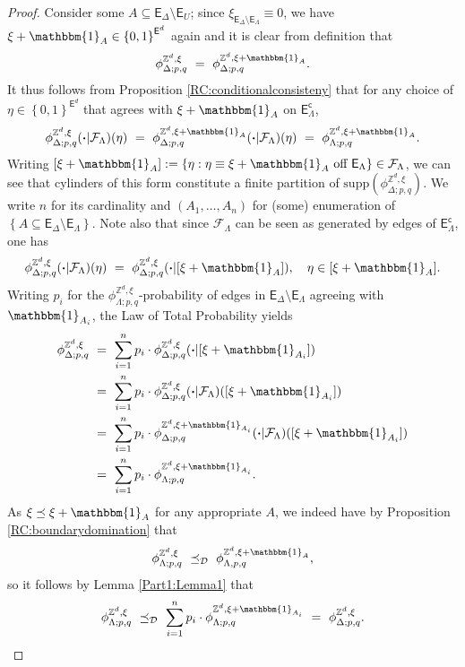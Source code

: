 \documentclass[12pt]{article}
\newcommand{\D}{\mathcal{D}}
\newcommand{\E}{\mathsf{E}}
\newcommand{\F}{\mathcal{F}}
\newcommand{\Z}{\mathbb{Z}}
\newcommand{\set}[1]{\left\{#1\right\}}
\newcommand{\pika}{\boldsymbol{\cdot}}
\newcommand{\1}{\mathbbm{1}}
\renewcommand{\c}{\mathsf{c}}
\newcommand{\supp}{\mathrm{supp}}
\newcommand{\5}{\vspace{0.5cm}}
\theoremstyle{definition}
\begin{document}
\begin{proof}
Consider some $A\subseteq\E_\Delta\setminus\E_U$; since $\xi_{\E_\Delta\setminus\E_\Lambda}\equiv 0$, we have $\xi+\1_A\in\set{0,1}^{\E^d}$ again and it is clear from definition that
$$\phi_{\Delta;p,q}^{\Z^d,\xi} ~=~ \phi_{\Delta;p,q}^{\Z^d,\xi+\1_A}.$$
It thus follows from Proposition \ref{RC:conditionalconsisteny} that for any choice of $\eta\in\set{0,1}^{\E^d}$ that agrees with $\xi+\1_A$ on $\E_\Lambda^\c$,
$$\phi_{\Delta;p,q}^{\Z^d,\xi}(\pika|\F_\Lambda)(\eta) ~=~ \phi_{\Delta;p,q}^{\Z^d,\xi+\1_A}(\pika|\F_\Lambda)(\eta) ~=~ \phi_{\Lambda;p,q}^{\Z^d,\xi+\1_A}.$$ 
Writing $[\xi+\1_A]:=\set{\eta:\eta\equiv \xi+\1_A~\text{off}~\E_\Lambda}\in\F_\Lambda$, we can see that cylinders of this form constitute a finite partition of $\supp(\phi_{\Delta;p,q}^{\Z^d,\xi})$. We write $n$ for its cardinality and $(A_1,\ldots,A_n)$ for (some) enumeration of $\set{A\subseteq\E_\Delta\setminus\E_\Lambda}$. Note also that since $\F_\Lambda$ can be seen as generated by edges of $\E_\Lambda^\c$, one has 
$$\phi_{\Delta;p,q}^{\Z^d,\xi}(\pika|\F_\Lambda)(\eta) ~=~ \phi_{\Delta;p,q}^{\Z^d,\xi}(\pika|[\xi+\1_A]), \quad \eta\in[\xi+\1_A].$$
Writing $p_i$ for the $\phi_{\Lambda;p,q}^{\Z^d,\xi}$-probability of edges in $\E_\Delta\setminus\E_\Lambda$ agreeing with $\1_{A_i}$, the Law of Total Probability yields
\begin{align*}
\phi_{\Delta;p,q}^{\Z^d,\xi} ~&=~ \sum_{i=1}^n p_i\cdot\phi_{\Delta;p,q}^{\Z^d,\xi}(\pika|[\xi+\1_{A_i}]) \\
&=~ \sum_{i=1}^n p_i\cdot\phi_{\Delta;p,q}^{\Z^d,\xi}(\pika|\F_\Lambda)([\xi+\1_{A_i}]) \\
&=~ \sum_{i=1}^n p_i\cdot\phi_{\Delta;p,q}^{\Z^d,\xi+\1_{A_i}}(\pika|\F_\Lambda)([\xi+\1_{A_i}]) \\
&=~ \sum_{i=1}^n p_i\cdot\phi_{\Lambda;p,q}^{\Z^d,\xi+\1_{A_i}}.
\end{align*}
As $\xi\preceq\xi+\1_A$ for any appropriate $A$, we indeed have by Proposition \ref{RC:boundarydomination} that
$$\phi_{\Lambda;p,q}^{\Z^d,\xi} ~\preceq_\D~ \phi_{\Lambda,p,q}^{\Z^d,\xi+\1_A},$$
so it follows by Lemma \ref{Part1:Lemma1} that
$$\phi_{\Lambda;p,q}^{\Z^d,\xi} ~\preceq_\D~ \sum_{i=1}^n p_i\cdot\phi_{\Lambda;p,q}^{\Z^d,\xi+\1_{A_i}} ~=~ \phi_{\Delta;p,q}^{\Z^d,\xi}.$$
\end{proof}
\end{document}
